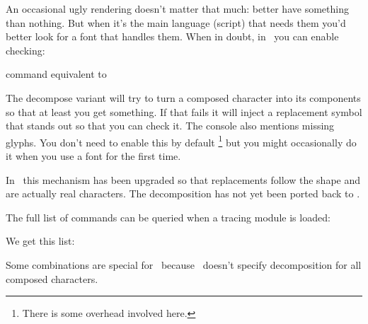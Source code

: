 An occasional ugly rendering doesn't matter that much: better have something than
nothing. But when it's the main language (script) that needs them you'd better
look for a font that handles them. When in doubt, in \CONTEXT\ you can enable
checking:

\starttabulate[|l|l|]
    \BC command                           \BC equivalent to \NC \NR
    \NC \type {\checkmissingcharacters}   \NC {} \NC \NR
    \NC \type {\removemissingcharacters}  \NC \type{\enabletrackers[fonts.missing=remove]} \NC \NR
    \NC \type {\replacemissingcharacters} \NC \type{\enabletrackers[fonts.missing=replace]} \NC \NR
    \NC \type {\handlemissingcharacters}  \NC \type{\enabletrackers[fonts.missing={decompose,replace}]} \NC \NR
\stoptabulate

The decompose variant will try to turn a composed character into its components
so that at least you get something. If that fails it will inject a replacement
symbol that stands out so that you can check it. The console also mentions
missing glyphs. You don't need to enable this by default \footnote {There is some
overhead involved here.} but you might occasionally do it when you use a font for
the first time.

In \LMTX\ this mechanism has been upgraded so that replacements follow the shape
and are actually real characters. The decomposition has not yet been ported back
to \MKIV.

The full list of commands can be queried when a tracing module is loaded:

\startbuffer
{}

\showcharactercombinations
\stopbuffer

\typebuffer

We get this list:

\getbuffer

Some combinations are special for \CONTEXT\ because \UNICODE\ doesn't specify
decomposition for all composed characters.

\stopsectionlevel

\stopdocument

